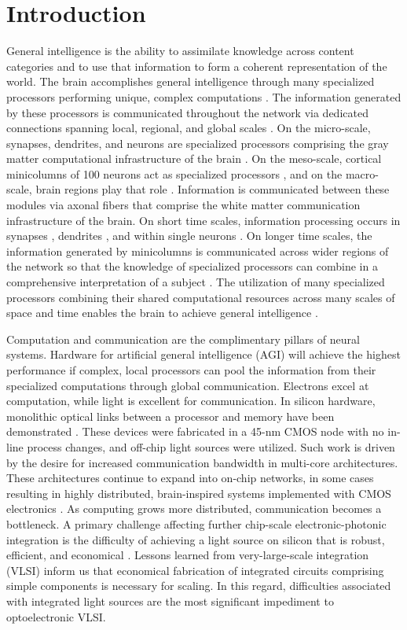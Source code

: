 \documentclass[twocolumn]{article}
\begin{document}
\section{\label{sec:introduction}Introduction}
General intelligence is the ability to assimilate knowledge across content categories and to use that information to form a coherent representation of the world. The brain accomplishes general intelligence through many specialized processors performing unique, complex computations \cite{ba1988,de2014}. The information generated by these processors is communicated throughout the network via dedicated connections spanning local, regional, and global scales \cite{sp2010}. On the micro-scale, synapses, dendrites, and neurons are specialized processors comprising the gray matter computational infrastructure of the brain \cite{geki2002}. On the meso-scale, cortical minicolumns of 100 neurons act as specialized processors \cite{mo1997}, and on the macro-scale, brain regions play that role \cite{brme2010}. Information is communicated between these modules via axonal fibers that comprise the white matter communication infrastructure of the brain. On short time scales, information processing occurs in synapses \cite{abre2004}, dendrites \cite{stsp2015}, and within single neurons \cite{ko1997}. On longer time scales, the information generated by minicolumns is communicated across wider regions of the network so that the knowledge of specialized processors can combine in a comprehensive interpretation of a subject \cite{bu2006}. The utilization of many specialized processors combining their shared computational resources across many scales of space and time enables the brain to achieve general intelligence \cite{ba1988,de2014}. 

Computation and communication are the complimentary pillars of neural systems. Hardware for artificial general intelligence (AGI) will achieve the highest performance if complex, local processors can pool the information from their specialized computations through global communication. Electrons excel at computation, while light is excellent for communication. In silicon hardware, monolithic optical links between a processor and memory have been demonstrated \cite{suwa2015}. These devices were fabricated in a 45-nm CMOS node with no in-line process changes, and off-chip light sources were utilized. Such work is driven by the desire for increased communication bandwidth in multi-core architectures. These architectures continue to expand into on-chip networks, in some cases resulting in highly distributed, brain-inspired systems implemented with CMOS electronics \cite{bo2000,pfgr2013,mear2014,fuga2014,payu2017,dasr2018}. As computing grows more distributed, communication becomes a bottleneck. A primary challenge affecting further chip-scale electronic-photonic integration is the difficulty of achieving a light source on silicon that is robust, efficient, and economical \cite{libo2010,zhyi2015}. Lessons learned from very-large-scale integration (VLSI) inform us that economical fabrication of integrated circuits comprising simple components is necessary for scaling. In this regard, difficulties associated with integrated light sources are the most significant impediment to optoelectronic VLSI.
\end{document}
